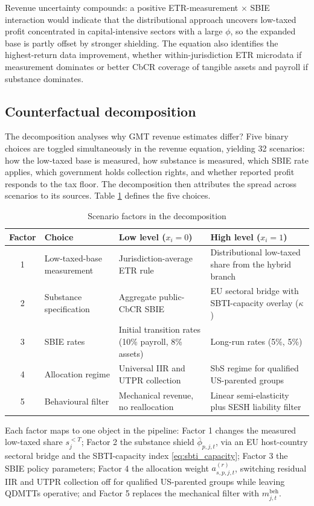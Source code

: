 \documentclass[11pt,a4paper]{article}
\begin{document}
Revenue uncertainty compounds: a positive ETR-measurement $\times$ SBIE interaction would indicate that the distributional approach uncovers low-taxed profit concentrated in capital-intensive sectors with a large $\phi$, so the expanded base is partly offset by stronger shielding. The equation also identifies the highest-return data improvement, whether within-jurisdiction ETR microdata if measurement dominates or better CbCR coverage of tangible assets and payroll if substance dominates.

\subsection{Counterfactual decomposition}\label{sec:decomposition}

The decomposition analyses why GMT revenue estimates differ? Five binary choices are toggled simultaneously in the revenue equation, yielding 32 scenarios: how the low-taxed base is measured, how substance is measured, which SBIE rate applies, which government holds collection rights, and whether reported profit responds to the tax floor. The decomposition then attributes the spread across scenarios to its sources. Table \ref{tab:factors} defines the five choices. 

\begin{table}[H]
\centering
\caption{Scenario factors in the decomposition}
\label{tab:factors}
\small
\begin{tabular}{@{}clp{5cm}p{5cm}@{}}
\toprule
Factor & Choice & Low level ($x_i = 0$) & High level ($x_i = 1$) \\
\midrule
1 & Low-taxed-base measurement & Jurisdiction-average ETR rule & Distributional low-taxed share from the hybrid branch \\
2 & Substance specification & Aggregate public-CbCR SBIE & EU sectoral bridge with SBTI-capacity overlay ($\kappa$) \\
3 & SBIE rates & Initial transition rates (10\% payroll, 8\% assets) & Long-run rates (5\%, 5\%) \\
4 & Allocation regime & Universal IIR and UTPR collection & SbS regime for qualified US-parented groups \\
5 & Behavioural filter & Mechanical revenue, no reallocation & Linear semi-elasticity plus SESH liability filter \\
\bottomrule
\end{tabular}
\end{table}

Each factor maps to one object in the pipeline: Factor 1 changes the measured low-taxed share $s_j^{<T}$; Factor 2 the substance shield $\bar{\phi}_{p,j,t}$, via an EU host-country sectoral bridge and the SBTI-capacity index \eqref{eq:sbti_capacity}; Factor 3 the SBIE policy parameters; Factor 4 the allocation weight $a_{s,p,j,t}^{(r)}$, switching residual IIR and UTPR collection off for qualified US-parented groups while leaving QDMTTs operative; and Factor 5 replaces the mechanical filter with $m_{j,t}^{\text{beh}}$.
\end{document}
